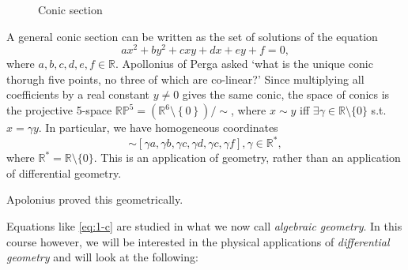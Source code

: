 \begin{wrapfigure}{R}{0.35\textwidth}
  \centering
  \caption{Conic section}
  \label{fig:l1f1}
\end{wrapfigure}
A general conic section can be written as the set of solutions of the equation
\begin{equation}
  \label{eq:1-c}
  ax^2 + by^2 + cxy + dx + ey + f = 0,
\end{equation}
where $a, b, c, d, e, f \in \mathbb{R}$.
Apollonius of Perga asked `what is the unique conic thorugh five points, no three of which are co-linear?'
Since multiplying all coefficients by a real constant $y \neq 0$ gives the same conic, the space of conics is the projective 5-space $\mathbb{RP}^5 = (\mathbb{R}^6 \setminus \left\{ 0 \right\}) / \sim$, where $x \sim y$ iff $\exists \gamma \in \mathbb{R} \setminus \{0\}$ s.t.~$x = \gamma y$. In particular, we have homogeneous coordinates
\begin{equation}
  [a, b, c, d, e, f] \sim [\gamma a, \gamma b, \gamma c, \gamma d, \gamma c, \gamma f], \gamma \in \mathbb{R}^*,
\end{equation}
where $\mathbb{R}^* = \mathbb{R} \setminus \{0\}$.
This is an application of geometry, rather than an application of differential geometry.
\begin{remark}
  Apolonius proved this geometrically. 
\end{remark}
Equations like \eqref{eq:1-c} are studied in what we now call \emph{algebraic geometry}.
In this course however, we will be interested in the physical applications of \emph{differential geometry} and will look at the following:
